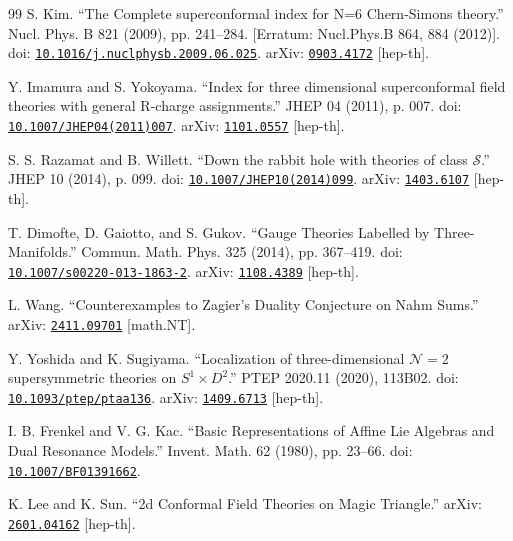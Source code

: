 \documentclass[11pt,a4paper]{article}
\numberwithin{equation}{section}
\begin{document}
\begin{thebibliography}{99}
S. Kim. ``The Complete superconformal index for N=6 Chern-Simons theory.'' Nucl. Phys. B 821 (2009), pp. 241--284. [Erratum: Nucl.Phys.B 864, 884 (2012)]. doi: \href{https://doi.org/10.1016/j.nuclphysb.2009.06.025}{\nolinkurl{10.1016/j.nuclphysb.2009.06.025}}. arXiv: \href{https://arxiv.org/abs/0903.4172}{\nolinkurl{0903.4172}} [hep-th].

Y. Imamura and S. Yokoyama. ``Index for three dimensional superconformal field theories with general R-charge assignments.'' JHEP 04 (2011), p. 007. doi: \href{https://doi.org/10.1007/JHEP04(2011)007}{\nolinkurl{10.1007/JHEP04(2011)007}}. arXiv: \href{https://arxiv.org/abs/1101.0557}{\nolinkurl{1101.0557}} [hep-th].

S. S. Razamat and B. Willett. ``Down the rabbit hole with theories of class $ \mathcal{S} $.'' JHEP 10 (2014), p. 099. doi: \href{https://doi.org/10.1007/JHEP10(2014)099}{\nolinkurl{10.1007/JHEP10(2014)099}}. arXiv: \href{https://arxiv.org/abs/1403.6107}{\nolinkurl{1403.6107}} [hep-th].

T. Dimofte, D. Gaiotto, and S. Gukov. ``Gauge Theories Labelled by Three-Manifolds.'' Commun. Math. Phys. 325 (2014), pp. 367--419. doi: \href{https://doi.org/10.1007/s00220-013-1863-2}{\nolinkurl{10.1007/s00220-013-1863-2}}. arXiv: \href{https://arxiv.org/abs/1108.4389}{\nolinkurl{1108.4389}} [hep-th].

L. Wang. ``Counterexamples to Zagier's Duality Conjecture on Nahm Sums.'' arXiv: \href{https://arxiv.org/abs/2411.09701}{\nolinkurl{2411.09701}} [math.NT].

Y. Yoshida and K. Sugiyama. ``Localization of three-dimensional $\mathcal{N}=2$ supersymmetric theories on $S^1 \times D^2$.'' PTEP 2020.11 (2020), 113B02. doi: \href{https://doi.org/10.1093/ptep/ptaa136}{\nolinkurl{10.1093/ptep/ptaa136}}. arXiv: \href{https://arxiv.org/abs/1409.6713}{\nolinkurl{1409.6713}} [hep-th].

I. B. Frenkel and V. G. Kac. ``Basic Representations of Affine Lie Algebras and Dual Resonance Models.'' Invent. Math. 62 (1980), pp. 23--66. doi: \href{https://doi.org/10.1007/BF01391662}{\nolinkurl{10.1007/BF01391662}}.

K. Lee and K. Sun. ``2d Conformal Field Theories on Magic Triangle.'' arXiv: \href{https://arxiv.org/abs/2601.04162}{\nolinkurl{2601.04162}} [hep-th].


\end{thebibliography}
\end{document}
